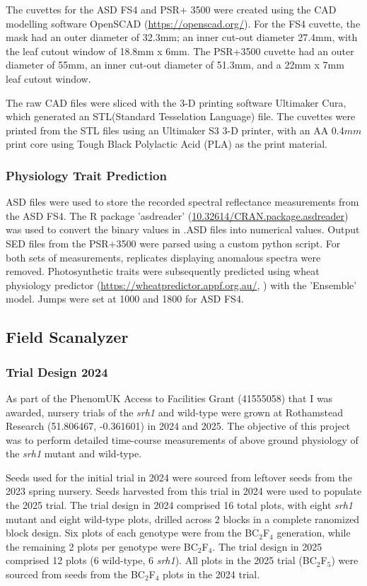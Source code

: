 \documentclass{article}
\begin{document}
The cuvettes for the ASD FS4 and PSR+ 3500 were created using the CAD modelling software OpenSCAD (\url{https://openscad.org/}). For the FS4 cuvette, the mask had an outer diameter of 32.3mm; an inner cut-out diameter 27.4mm, with the leaf cutout window of 18.8mm x 6mm. The PSR+3500 cuvette had an outer diameter of 55mm, an inner cut-out diameter of 51.3mm, and a 22mm x 7mm leaf cutout window.

The raw CAD files were sliced with the 3-D printing software Ultimaker Cura, which generated an STL(Standard Tesselation Language) file. The cuvettes were printed from the STL files using an Ultimaker S3 3-D printer, with an AA 0.4$mm$print core using Tough Black Polylactic Acid (PLA) as the print material.

\subsubsection{Physiology Trait Prediction}
ASD files were used to store the recorded spectral reflectance measurements from the ASD FS4. The R package 'asdreader' (\url{10.32614/CRAN.package.asdreader}) was used to convert the binary values in .ASD files into numerical values. Output SED files from the PSR+3500 were parsed using a custom python script. For both sets of measurements, replicates displaying anomalous spectra were removed. Photosynthetic traits were subsequently predicted using wheat physiology
predictor (\url{https://wheatpredictor.appf.org.au/}, \cite{furbank_wheat_2021}) with the
'Ensemble' model. Jumps were set at 1000 and 1800 for ASD FS4.

\subsection{Field Scanalyzer}

\subsubsection{Trial Design 2024}
As part of the PhenomUK Access to Facilities Grant (41555058) that I was awarded, nursery trials of the \textit{srh1} and wild-type were grown at Rothamstead Research (51.806467, -0.361601) in 2024 and 2025. The objective of this project was to perform detailed time-course measurements of above ground physiology of the \textit{srh1} mutant and wild-type.

Seeds used for the initial trial in 2024 were sourced from leftover seeds from the 2023 spring nursery. Seeds harvested from this trial in 2024 were used to populate the 2025 trial. The trial design in 2024 comprised 16 total plots, with eight \textit{srh1} mutant and eight wild-type plots, drilled across 2 blocks in a complete ranomized block design. Six plots of each genotype were from the BC$_{2}$F$_{4}$ generation, while the remaining 2 plots per genotype were BC$_{2}$F$_{4}$. The trial design in 2025 comprised 12 plots (6 wild-type, 6 \textit{srh1}). All plots in the 2025 trial (BC$_{2}$F$_{5}$) were sourced from seeds from the BC$_{2}$F$_{4}$ plots in the 2024 trial.
\end{document}
